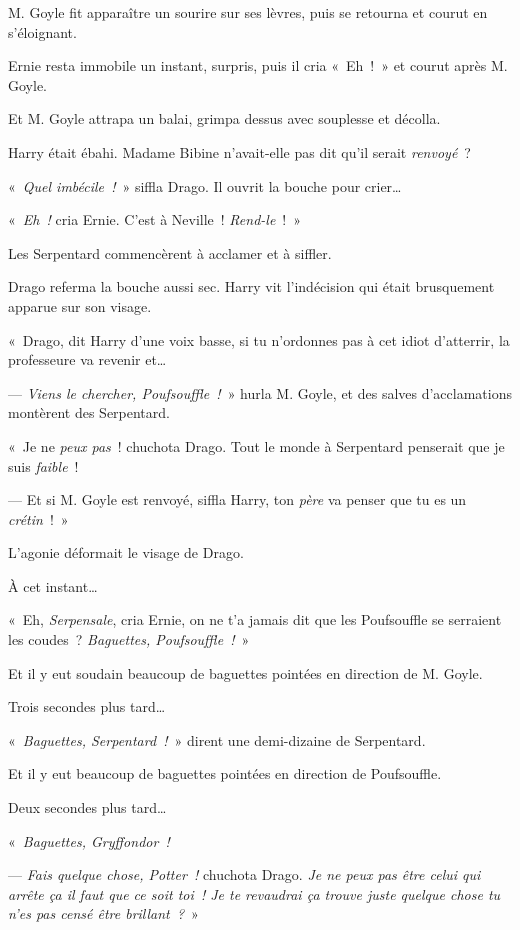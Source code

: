 M. Goyle fit apparaître un sourire sur ses lèvres, puis se retourna et courut en s'éloignant.

Ernie resta immobile un instant, surpris, puis il cria «~Eh~!~» et courut après M. Goyle.

Et M. Goyle attrapa un balai, grimpa dessus avec souplesse et décolla.

Harry était ébahi. Madame Bibine n'avait-elle pas dit qu'il serait \emph{renvoyé}~?

«~\emph{Quel imbécile~!}~» siffla Drago. Il ouvrit la bouche pour crier…

«~\emph{Eh~!} cria Ernie. C'est à Neville~! \emph{Rend-le}~!~»

Les Serpentard commencèrent à acclamer et à siffler.

Drago referma la bouche aussi sec.
Harry vit l'indécision qui était brusquement apparue sur son visage.

«~Drago, dit Harry d'une voix basse, si tu n'ordonnes pas à cet idiot d'atterrir, la professeure va revenir et…

--- \emph{Viens le chercher, Poufsouffle~!}~» hurla M. Goyle, et des salves d'acclamations montèrent des Serpentard.

«~Je ne \emph{peux pas}~! chuchota Drago.
Tout le monde à Serpentard penserait que je suis \emph{faible}~!

--- Et si M. Goyle est renvoyé, siffla Harry, ton \emph{père} va penser que tu es un \emph{crétin}~!~»

L'agonie déformait le visage de Drago.

À cet instant…

«~Eh, \emph{Serpensale}, cria Ernie, on ne t'a jamais dit que les Poufsouffle se serraient les coudes~? \emph{Baguettes, Poufsouffle~!}~»

Et il y eut soudain beaucoup de baguettes pointées en direction de M. Goyle.

Trois secondes plus tard…

«~\emph{Baguettes, Serpentard~!}~» dirent une demi-dizaine de Serpentard.

Et il y eut beaucoup de baguettes pointées en direction de Poufsouffle.

Deux secondes plus tard…

«~\emph{Baguettes, Gryffondor~!}

--- \emph{Fais quelque chose, Potter~!} chuchota Drago.
\emph{Je ne peux pas être celui qui arrête ça il faut que ce soit toi~!
Je te revaudrai ça trouve juste quelque chose tu n'es pas censé être brillant~?}~»

